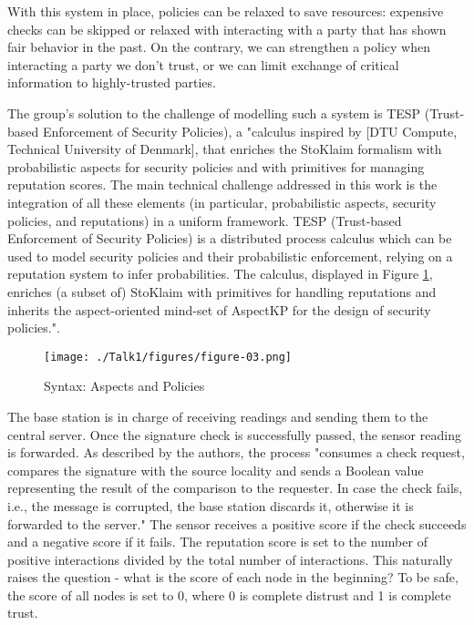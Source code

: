 \documentclass[12pt,a4paper,twoside]{report}
\begin{document}
With this system in place, policies can be relaxed to save resources: expensive checks can be skipped or relaxed with interacting with a party that has shown fair behavior in the past. On the contrary, we can strengthen a policy when interacting a party we don't trust, or we can limit exchange of critical information to highly-trusted parties. \par
The group's solution to the challenge of modelling such a system is TESP (Trust-based Enforcement of Security Policies), a "calculus inspired by [DTU Compute, Technical University of Denmark], that enriches the StoKlaim \cite{sen:2009} formalism with probabilistic aspects for security policies and with primitives for managing reputation scores. The main technical challenge addressed in this work is the integration of all these elements (in particular, probabilistic aspects, security policies, and reputations) in a uniform framework. TESP (Trust-based Enforcement of Security Policies) is a distributed process calculus which can be used to model security policies and their probabilistic enforcement, relying on a reputation system to infer probabilities. The calculus, displayed in Figure \ref{fig:03}, enriches (a subset of) StoKlaim with primitives for handling reputations and inherits the aspect-oriented mind-set of AspectKP for the design of security policies."\cite{vigo;etal:2014}.\par
\begin{figure}[ht]
	\begin{center}
  \texttt{[image: ./Talk1/figures/figure-03.png]}
  \end{center}
  \caption{Syntax: Aspects and Policies \cite{vigo;etal:2014}}
  \label{fig:03}
\end{figure}
The base station is in charge of receiving readings and sending them to the central server. Once the signature check is successfully passed, the sensor reading is forwarded. As described by the authors, the process "consumes a check request, compares the signature with the source locality and sends a Boolean value representing the result of the comparison to the requester. In case the check fails, i.e., the message is corrupted, the base station discards it, otherwise it is forwarded to the server." The sensor receives a positive score if the check succeeds and a negative score if it fails. The reputation score is set to the number of positive interactions divided by the total number of interactions. This naturally raises the question - what is the score of each node in the beginning? To be safe, the score of all nodes is set to 0, where 0 is complete distrust and 1 is complete trust. \par
\end{document}
